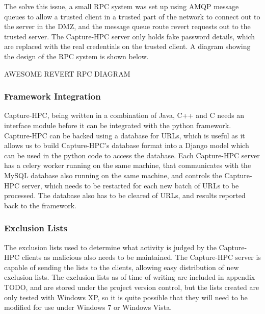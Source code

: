 The solve this issue, a small RPC system was set up using AMQP message queues to
allow a trusted client in a trusted part of the network to connect out to the
server in the DMZ, and the message queue route revert requests out to the
trusted server. The Capture-HPC server only holds fake password details, which
are replaced with the real credentials on the trusted client. A diagram showing
the design of the RPC system is shown below. 

AWESOME REVERT RPC DIAGRAM

\subsubsection{Framework Integration}

Capture-HPC, being written in a combination of Java, C++ and C needs an
interface module before it can be integrated with the python framework.
Capture-HPC can be backed using a database for URLs, which is useful as it
allows us to build Capture-HPC's database format into a Django model which can
be used in the python code to access the database. Each Capture-HPC server has a
celery worker running on the same machine, that communicates with the MySQL
database also running on the same machine, and controls the Capture-HPC
server, which needs to be restarted for each new batch of URLs to be processed.
The database also has to be cleared of URLs, and results reported back to the
framework.

\subsubsection{Exclusion Lists}

The exclusion lists used to determine what activity is judged by the Capture-HPC
clients as malicious also needs to be maintained. The Capture-HPC server is
capable of sending the lists to the clients, allowing easy distribution of new
exclusion lists. The exclusion lists as of time of writing are included in
appendix TODO, and are stored under the project version control, but the lists
created are only tested with Windows XP, so it is quite possible that they will
need to be modified for use under Windows 7 or Windows Vista.


